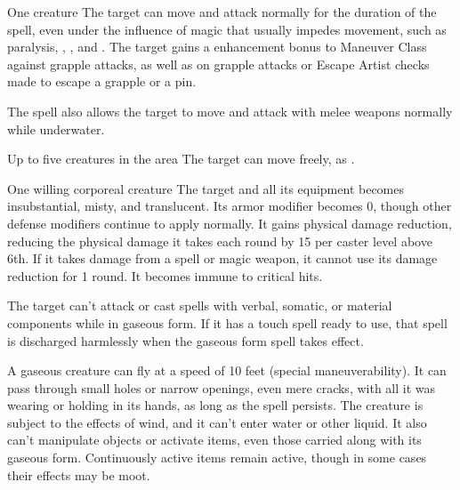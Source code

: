\spellrng{\rngtouch}
\spelldur{\durshort}
\begin{spelltarget}{One creature}
    \spelleffect The target can move and attack normally for the duration of the spell, even under the influence of magic that usually impedes movement, such as paralysis, , , and . The target gains a  enhancement bonus to Maneuver Class against grapple attacks, as well as on grapple attacks or Escape Artist checks made to escape a grapple or a pin.
    \par The spell also allows the target to move and attack with melee weapons normally while underwater.
\end{spelltarget}

\begin{spelltargets}{Up to five creatures in the area}
    \spelleffect The target can move freely, as .
\end{spelltargets}

\begin{comment}
\subsubsection{G}
\end{comment}

\spellrng{\rngtouch}
\spelldur{\durshort \dismissable}
\begin{spelltarget}{One willing corporeal creature}
    \spelleffect The target and all its equipment becomes insubstantial, misty, and translucent. Its armor modifier becomes 0, though other defense modifiers continue to apply normally. It gains physical damage reduction, reducing the physical damage it takes each round by 15  per caster level above 6th. If it takes damage from a spell or magic weapon, it cannot use its damage reduction for 1 round. It becomes immune to critical hits.

    The target can't attack or cast spells with verbal, somatic, or material components while in gaseous form. If it has a touch spell ready to use, that spell is discharged harmlessly when the gaseous form spell takes effect.
    \par A gaseous creature can fly at a speed of 10 feet (special maneuverability). It can pass through small holes or narrow openings, even mere cracks, with all it was wearing or holding in its hands, as long as the spell persists. The creature is subject to the effects of wind, and it can't enter water or other liquid. It also can't manipulate objects or activate items, even those carried along with its gaseous form. Continuously active items remain active, though in some cases their effects may be moot.
\end{spelltarget}

